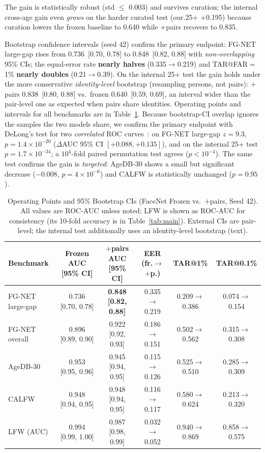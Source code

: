\documentclass[journal]{IEEEtran}
\begin{document}
The gain is statistically robust (std $\leq$ 0.003) and survives curation; the internal cross-age gain even \emph{grows} on the harder curated test (our.25+ $+$0.195) because curation lowers the frozen baseline to 0.640 while $+$pairs recovers to 0.835.

Bootstrap confidence intervals (seed 42) confirm the primary endpoint: FG-NET large-gap rises from 0.736~[0.70, 0.78] to 0.848~[0.82, 0.88] with \emph{non-overlapping} 95\% CIs; the equal-error rate \textbf{nearly halves} (0.335$\to$0.219) and TAR@FAR$=$1\% \textbf{nearly doubles} (0.21$\to$0.39). On the internal 25+ test the gain holds under the more conservative \emph{identity-level} bootstrap (resampling persons, not pairs): $+$pairs 0.838~[0.80, 0.88] vs.\ frozen 0.640~[0.59, 0.69], an interval wider than the pair-level one as expected when pairs share identities. Operating points and intervals for all benchmarks are in Table~\ref{tab:stats}. Because bootstrap-CI overlap ignores the samples the two models share, we confirm the primary endpoint with DeLong's test for two \emph{correlated} ROC curves~\cite{delong1988}: on FG-NET large-gap $z=9.3$, $p=1.4\times10^{-20}$ ($\Delta$AUC 95\% CI $[+0.088,+0.135]$), and on the internal 25+ test $p=1.7\times10^{-34}$; a $10^4$-fold paired permutation test agrees ($p<10^{-4}$). The same test confirms the gain is \emph{targeted}: AgeDB-30 shows a small but significant decrease ($-$0.008, $p=4\times10^{-6}$) and CALFW is statistically unchanged ($p=0.95$).

\begin{table}[!t]
\renewcommand{\arraystretch}{1.2}
\caption{Operating Points and 95\% Bootstrap CIs (FaceNet Frozen vs.\ $+$pairs, Seed 42). All values are ROC-AUC unless noted; LFW is shown as ROC-AUC for consistency (its 10-fold accuracy is in Table~\ref{tab:main}). External CIs are pair-level; the internal test additionally uses an identity-level bootstrap (text).}
\label{tab:stats}
\centering
\footnotesize
\begin{tabular}{@{}lccccc@{}}
\toprule
Benchmark & Frozen AUC [95\% CI] & $+$pairs AUC [95\% CI] & EER (fr.$\to$$+$p.) & TAR@1\% & TAR@0.1\% \\
\midrule
FG-NET large-gap & 0.736 [0.70, 0.78] & \textbf{0.848 [0.82, 0.88]} & 0.335$\to$0.219 & 0.209$\to$0.386 & 0.074$\to$0.154 \\
FG-NET overall & 0.896 [0.89, 0.90] & 0.922 [0.92, 0.93] & 0.186$\to$0.151 & 0.502$\to$0.562 & 0.315$\to$0.308 \\
AgeDB-30 & 0.953 [0.95, 0.96] & 0.945 [0.94, 0.95] & 0.115$\to$0.126 & 0.525$\to$0.510 & 0.285$\to$0.309 \\
CALFW & 0.948 [0.94, 0.95] & 0.948 [0.94, 0.95] & 0.116$\to$0.117 & 0.580$\to$0.624 & 0.213$\to$0.320 \\
LFW (AUC) & 0.994 [0.99, 1.00] & 0.987 [0.98, 0.99] & 0.032$\to$0.052 & 0.940$\to$0.869 & 0.858$\to$0.575 \\
\bottomrule
\end{tabular}
\end{table}
\end{document}
